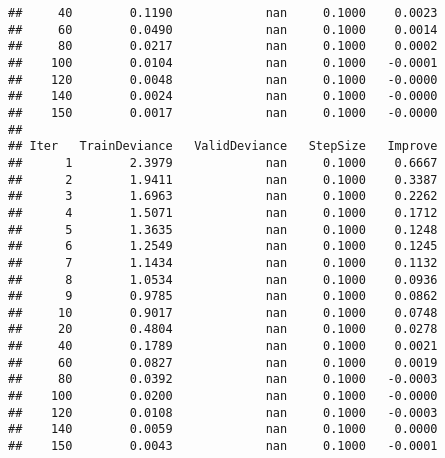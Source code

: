 \documentclass[]{article}
\newenvironment{Shaded}{\begin{snugshade}}{\end{snugshade}}
\newcommand{\KeywordTok}[1]{\textcolor[rgb]{0.13,0.29,0.53}{\textbf{#1}}}
\newcommand{\OperatorTok}[1]{\textcolor[rgb]{0.81,0.36,0.00}{\textbf{#1}}}
\newcommand{\NormalTok}[1]{#1}
\begin{document}
\begin{verbatim}
##     40        0.1190             nan     0.1000    0.0023
##     60        0.0490             nan     0.1000    0.0014
##     80        0.0217             nan     0.1000    0.0002
##    100        0.0104             nan     0.1000   -0.0001
##    120        0.0048             nan     0.1000   -0.0000
##    140        0.0024             nan     0.1000   -0.0000
##    150        0.0017             nan     0.1000   -0.0000
## 
## Iter   TrainDeviance   ValidDeviance   StepSize   Improve
##      1        2.3979             nan     0.1000    0.6667
##      2        1.9411             nan     0.1000    0.3387
##      3        1.6963             nan     0.1000    0.2262
##      4        1.5071             nan     0.1000    0.1712
##      5        1.3635             nan     0.1000    0.1248
##      6        1.2549             nan     0.1000    0.1245
##      7        1.1434             nan     0.1000    0.1132
##      8        1.0534             nan     0.1000    0.0936
##      9        0.9785             nan     0.1000    0.0862
##     10        0.9017             nan     0.1000    0.0748
##     20        0.4804             nan     0.1000    0.0278
##     40        0.1789             nan     0.1000    0.0021
##     60        0.0827             nan     0.1000    0.0019
##     80        0.0392             nan     0.1000   -0.0003
##    100        0.0200             nan     0.1000   -0.0000
##    120        0.0108             nan     0.1000   -0.0003
##    140        0.0059             nan     0.1000    0.0000
##    150        0.0043             nan     0.1000   -0.0001
\end{verbatim}

\begin{Shaded}
\end{Shaded}
\end{document}
